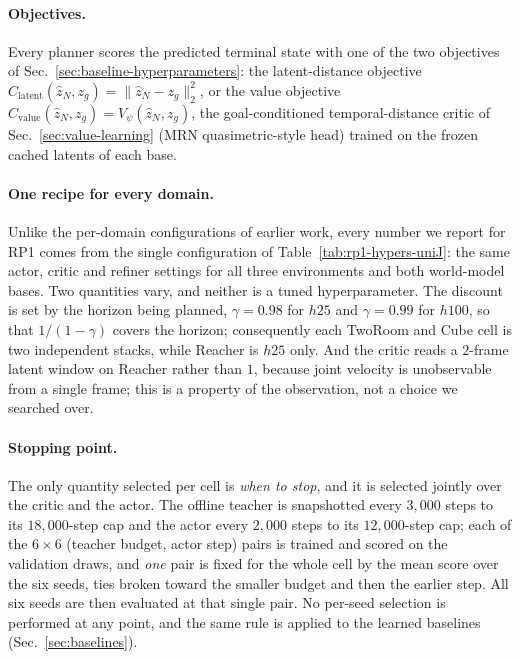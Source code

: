 \paragraph{Objectives.}
Every planner scores the predicted terminal state with one of the two objectives of
Sec.~\ref{sec:baseline-hyperparameters}: the latent-distance objective
$C_{\mathrm{latent}}(\hat z_N,z_g)=\lVert\hat z_N-z_g\rVert_2^2$, or the value objective
$C_{\mathrm{value}}(\hat z_N,z_g)=V_\psi(\hat z_N,z_g)$, the goal-conditioned
temporal-distance critic of Sec.~\ref{sec:value-learning} (MRN quasimetric-style head)
trained on the frozen cached latents of each base.

\paragraph{One recipe for every domain.}
Unlike the per-domain configurations of earlier work, every number we report for RP1
comes from the single configuration of Table~\ref{tab:rp1-hypers-uniJ}: the same actor,
critic and refiner settings for all three environments and both world-model bases. Two
quantities vary, and neither is a tuned hyperparameter. The discount is set by the
horizon being planned, $\gamma{=}0.98$ for $h25$ and $\gamma{=}0.99$ for $h100$, so that
$1/(1-\gamma)$ covers the horizon; consequently each TwoRoom and Cube cell is two
independent stacks, while Reacher is $h25$ only. And the critic reads a $2$-frame latent
window on Reacher rather than $1$, because joint velocity is unobservable from a single
frame; this is a property of the observation, not a choice we searched over.

\paragraph{Stopping point.}
The only quantity selected per cell is \emph{when to stop}, and it is selected jointly
over the critic and the actor. The offline teacher is snapshotted every $3{,}000$ steps
to its $18{,}000$-step cap and the actor every $2{,}000$ steps to its $12{,}000$-step
cap; each of the $6\times6$ (teacher budget, actor step) pairs is trained and scored on
the validation draws, and \emph{one} pair is fixed for the whole cell by the mean score
over the six seeds, ties broken toward the smaller budget and then the earlier step. All
six seeds are then evaluated at that single pair. No per-seed selection is performed at
any point, and the same rule is applied to the learned baselines
(Sec.~\ref{sec:baselines}).

